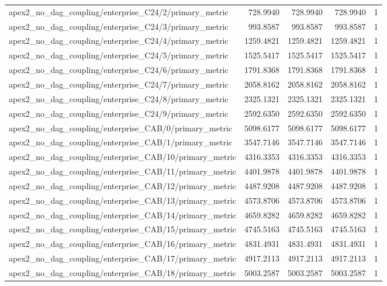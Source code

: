 \begin{table}[h]
\begin{tabular}{lrrrr}
apex2_no_dag_coupling/enterprise_C24/2/primary_metric & 728.9940 & 728.9940 & 728.9940 & 1 \\
apex2_no_dag_coupling/enterprise_C24/3/primary_metric & 993.8587 & 993.8587 & 993.8587 & 1 \\
apex2_no_dag_coupling/enterprise_C24/4/primary_metric & 1259.4821 & 1259.4821 & 1259.4821 & 1 \\
apex2_no_dag_coupling/enterprise_C24/5/primary_metric & 1525.5417 & 1525.5417 & 1525.5417 & 1 \\
apex2_no_dag_coupling/enterprise_C24/6/primary_metric & 1791.8368 & 1791.8368 & 1791.8368 & 1 \\
apex2_no_dag_coupling/enterprise_C24/7/primary_metric & 2058.8162 & 2058.8162 & 2058.8162 & 1 \\
apex2_no_dag_coupling/enterprise_C24/8/primary_metric & 2325.1321 & 2325.1321 & 2325.1321 & 1 \\
apex2_no_dag_coupling/enterprise_C24/9/primary_metric & 2592.6350 & 2592.6350 & 2592.6350 & 1 \\
apex2_no_dag_coupling/enterprise_CAB/0/primary_metric & 5098.6177 & 5098.6177 & 5098.6177 & 1 \\
apex2_no_dag_coupling/enterprise_CAB/1/primary_metric & 3547.7146 & 3547.7146 & 3547.7146 & 1 \\
apex2_no_dag_coupling/enterprise_CAB/10/primary_metric & 4316.3353 & 4316.3353 & 4316.3353 & 1 \\
apex2_no_dag_coupling/enterprise_CAB/11/primary_metric & 4401.9878 & 4401.9878 & 4401.9878 & 1 \\
apex2_no_dag_coupling/enterprise_CAB/12/primary_metric & 4487.9208 & 4487.9208 & 4487.9208 & 1 \\
apex2_no_dag_coupling/enterprise_CAB/13/primary_metric & 4573.8706 & 4573.8706 & 4573.8706 & 1 \\
apex2_no_dag_coupling/enterprise_CAB/14/primary_metric & 4659.8282 & 4659.8282 & 4659.8282 & 1 \\
apex2_no_dag_coupling/enterprise_CAB/15/primary_metric & 4745.5163 & 4745.5163 & 4745.5163 & 1 \\
apex2_no_dag_coupling/enterprise_CAB/16/primary_metric & 4831.4931 & 4831.4931 & 4831.4931 & 1 \\
apex2_no_dag_coupling/enterprise_CAB/17/primary_metric & 4917.2113 & 4917.2113 & 4917.2113 & 1 \\
apex2_no_dag_coupling/enterprise_CAB/18/primary_metric & 5003.2587 & 5003.2587 & 5003.2587 & 1 \\

\end{tabular}
\end{table}
